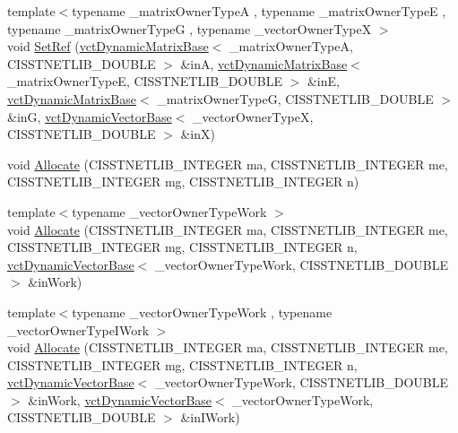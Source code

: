 \begin{DoxyCompactItemize}
\item 
{\footnotesize template$<$typename \+\_\+matrix\+Owner\+Type\+A , typename \+\_\+matrix\+Owner\+Type\+E , typename \+\_\+matrix\+Owner\+Type\+G , typename \+\_\+vector\+Owner\+Type\+X $>$ }\\void \hyperlink{classnmr_l_sq_lin_solution_dynamic_ad1fb6f082367bb63752c46a18e5af988}{Set\+Ref} (\hyperlink{classvct_dynamic_matrix_base}{vct\+Dynamic\+Matrix\+Base}$<$ \+\_\+matrix\+Owner\+Type\+A, C\+I\+S\+S\+T\+N\+E\+T\+L\+I\+B\+\_\+\+D\+O\+U\+B\+L\+E $>$ \&in\+A, \hyperlink{classvct_dynamic_matrix_base}{vct\+Dynamic\+Matrix\+Base}$<$ \+\_\+matrix\+Owner\+Type\+E, C\+I\+S\+S\+T\+N\+E\+T\+L\+I\+B\+\_\+\+D\+O\+U\+B\+L\+E $>$ \&in\+E, \hyperlink{classvct_dynamic_matrix_base}{vct\+Dynamic\+Matrix\+Base}$<$ \+\_\+matrix\+Owner\+Type\+G, C\+I\+S\+S\+T\+N\+E\+T\+L\+I\+B\+\_\+\+D\+O\+U\+B\+L\+E $>$ \&in\+G, \hyperlink{classvct_dynamic_vector_base}{vct\+Dynamic\+Vector\+Base}$<$ \+\_\+vector\+Owner\+Type\+X, C\+I\+S\+S\+T\+N\+E\+T\+L\+I\+B\+\_\+\+D\+O\+U\+B\+L\+E $>$ \&in\+X)
\item 
void \hyperlink{classnmr_l_sq_lin_solution_dynamic_a302d85673ef55080591d54a4b743f583}{Allocate} (C\+I\+S\+S\+T\+N\+E\+T\+L\+I\+B\+\_\+\+I\+N\+T\+E\+G\+E\+R ma, C\+I\+S\+S\+T\+N\+E\+T\+L\+I\+B\+\_\+\+I\+N\+T\+E\+G\+E\+R me, C\+I\+S\+S\+T\+N\+E\+T\+L\+I\+B\+\_\+\+I\+N\+T\+E\+G\+E\+R mg, C\+I\+S\+S\+T\+N\+E\+T\+L\+I\+B\+\_\+\+I\+N\+T\+E\+G\+E\+R n)
\item 
{\footnotesize template$<$typename \+\_\+vector\+Owner\+Type\+Work $>$ }\\void \hyperlink{classnmr_l_sq_lin_solution_dynamic_abee81b94c41e77a42d4f889406a40c25}{Allocate} (C\+I\+S\+S\+T\+N\+E\+T\+L\+I\+B\+\_\+\+I\+N\+T\+E\+G\+E\+R ma, C\+I\+S\+S\+T\+N\+E\+T\+L\+I\+B\+\_\+\+I\+N\+T\+E\+G\+E\+R me, C\+I\+S\+S\+T\+N\+E\+T\+L\+I\+B\+\_\+\+I\+N\+T\+E\+G\+E\+R mg, C\+I\+S\+S\+T\+N\+E\+T\+L\+I\+B\+\_\+\+I\+N\+T\+E\+G\+E\+R n, \hyperlink{classvct_dynamic_vector_base}{vct\+Dynamic\+Vector\+Base}$<$ \+\_\+vector\+Owner\+Type\+Work, C\+I\+S\+S\+T\+N\+E\+T\+L\+I\+B\+\_\+\+D\+O\+U\+B\+L\+E $>$ \&in\+Work)
\item 
{\footnotesize template$<$typename \+\_\+vector\+Owner\+Type\+Work , typename \+\_\+vector\+Owner\+Type\+I\+Work $>$ }\\void \hyperlink{classnmr_l_sq_lin_solution_dynamic_ac75ebeb5d37ad8db3431bbbfa289f936}{Allocate} (C\+I\+S\+S\+T\+N\+E\+T\+L\+I\+B\+\_\+\+I\+N\+T\+E\+G\+E\+R ma, C\+I\+S\+S\+T\+N\+E\+T\+L\+I\+B\+\_\+\+I\+N\+T\+E\+G\+E\+R me, C\+I\+S\+S\+T\+N\+E\+T\+L\+I\+B\+\_\+\+I\+N\+T\+E\+G\+E\+R mg, C\+I\+S\+S\+T\+N\+E\+T\+L\+I\+B\+\_\+\+I\+N\+T\+E\+G\+E\+R n, \hyperlink{classvct_dynamic_vector_base}{vct\+Dynamic\+Vector\+Base}$<$ \+\_\+vector\+Owner\+Type\+Work, C\+I\+S\+S\+T\+N\+E\+T\+L\+I\+B\+\_\+\+D\+O\+U\+B\+L\+E $>$ \&in\+Work, \hyperlink{classvct_dynamic_vector_base}{vct\+Dynamic\+Vector\+Base}$<$ \+\_\+vector\+Owner\+Type\+Work, C\+I\+S\+S\+T\+N\+E\+T\+L\+I\+B\+\_\+\+D\+O\+U\+B\+L\+E $>$ \&in\+I\+Work)

\end{DoxyCompactItemize}
